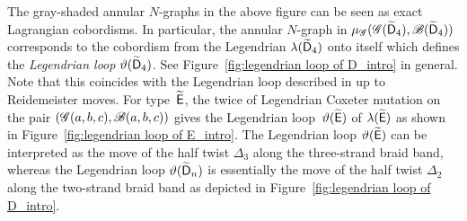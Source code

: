 The gray-shaded annular $N$-graphs in the above figure can be seen as exact Lagrangian cobordisms. 
In particular, the annular $N$-graph in $\mu_\mathscr{G}(\mathscr{G}(\widetilde{\mathsf{D}}_{4}),\mathscr{B}(\widetilde{\mathsf{D}}_{4}))$ corresponds to the cobordism from the Legendrian $\lambda(\widetilde{\mathsf{D}}_4)$ onto itself which defines the \emph{Legendrian loop} $\vartheta(\widetilde{\mathsf{D}}_4)$. 
See Figure~\ref{fig:legendrian loop of D_intro} in general.
Note that this coincides with the Legendrian loop described in \cite[Figure~2]{CN2021} up to Reidemeister moves. For type~$\widetilde{\mathsf{E}}$, the twice of 
Legendrian Coxeter mutation on the pair $(\mathscr{G}(a,b,c),\mathscr{B}(a,b,c))$ gives
the Legendrian loop~$\vartheta(\widetilde{\mathsf{E}})$ of $\lambda(\widetilde{\mathsf{E}})$ as shown in Figure~\ref{fig:legendrian loop of E_intro}.
The Legendrian loop $\vartheta(\widetilde{\mathsf{E}})$ can be interpreted as the move of the half twist $\Delta_3$ along the three-strand braid band, whereas the Legendrian loop $\vartheta(\widetilde{\mathsf{D}}_n)$ is essentially the move of the half twist $\Delta_2$ along the two-strand braid band as depicted in Figure~\ref{fig:legendrian loop of D_intro}.

